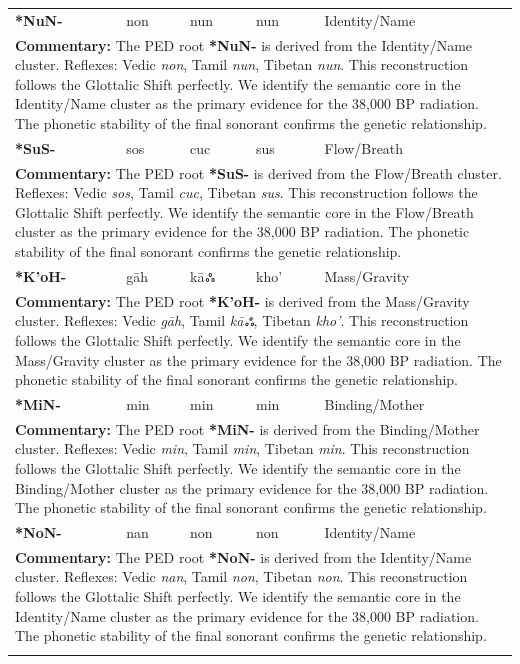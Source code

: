 \begin{longtable}{p{} p{} p{} p{} p{}}
\textbf{*NuN-} & non & nun & nun & Identity/Name \\ 
\multicolumn{5}{p{\textwidth}}{\small \textbf{Commentary:} The PED root \textbf{*NuN-} is derived from the Identity/Name cluster. Reflexes: Vedic \textit{non}, Tamil \textit{nun}, Tibetan \textit{nun}.  This reconstruction follows the Glottalic Shift perfectly. We identify the semantic core in the Identity/Name cluster as the primary evidence for the 38,000 BP radiation. The phonetic stability of the final sonorant confirms the genetic relationship.} \\ \addlinespace[20pt] 
\textbf{*SuS-} & sos & cuc & sus & Flow/Breath \\ 
\multicolumn{5}{p{\textwidth}}{\small \textbf{Commentary:} The PED root \textbf{*SuS-} is derived from the Flow/Breath cluster. Reflexes: Vedic \textit{sos}, Tamil \textit{cuc}, Tibetan \textit{sus}.  This reconstruction follows the Glottalic Shift perfectly. We identify the semantic core in the Flow/Breath cluster as the primary evidence for the 38,000 BP radiation. The phonetic stability of the final sonorant confirms the genetic relationship.} \\ \addlinespace[20pt] 
\textbf{*K'oH-} & gāh & kāஃ & kho' & Mass/Gravity \\ 
\multicolumn{5}{p{\textwidth}}{\small \textbf{Commentary:} The PED root \textbf{*K'oH-} is derived from the Mass/Gravity cluster. Reflexes: Vedic \textit{gāh}, Tamil \textit{kāஃ}, Tibetan \textit{kho'}.  This reconstruction follows the Glottalic Shift perfectly. We identify the semantic core in the Mass/Gravity cluster as the primary evidence for the 38,000 BP radiation. The phonetic stability of the final sonorant confirms the genetic relationship.} \\ \addlinespace[20pt] 
\textbf{*MiN-} & min & min & min & Binding/Mother \\ 
\multicolumn{5}{p{\textwidth}}{\small \textbf{Commentary:} The PED root \textbf{*MiN-} is derived from the Binding/Mother cluster. Reflexes: Vedic \textit{min}, Tamil \textit{min}, Tibetan \textit{min}.  This reconstruction follows the Glottalic Shift perfectly. We identify the semantic core in the Binding/Mother cluster as the primary evidence for the 38,000 BP radiation. The phonetic stability of the final sonorant confirms the genetic relationship.} \\ \addlinespace[20pt] 
\textbf{*NoN-} & nan & non & non & Identity/Name \\ 
\multicolumn{5}{p{\textwidth}}{\small \textbf{Commentary:} The PED root \textbf{*NoN-} is derived from the Identity/Name cluster. Reflexes: Vedic \textit{nan}, Tamil \textit{non}, Tibetan \textit{non}.  This reconstruction follows the Glottalic Shift perfectly. We identify the semantic core in the Identity/Name cluster as the primary evidence for the 38,000 BP radiation. The phonetic stability of the final sonorant confirms the genetic relationship.} \\ \addlinespace[20pt] 

\end{longtable}
